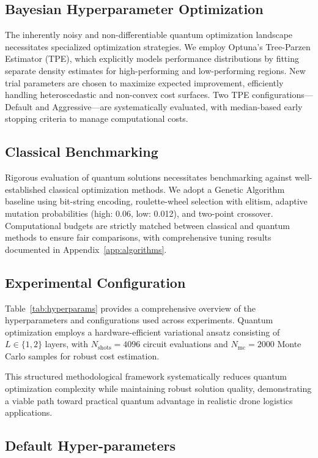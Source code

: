\subsection{Bayesian Hyperparameter Optimization}

The inherently noisy and non-differentiable quantum optimization landscape necessitates specialized optimization strategies. We employ Optuna's Tree-Parzen Estimator (TPE), which explicitly models performance distributions by fitting separate density estimates for high-performing and low-performing regions. New trial parameters are chosen to maximize expected improvement, efficiently handling heteroscedastic and non-convex cost surfaces. Two TPE configurations---Default and Aggressive---are systematically evaluated, with median-based early stopping criteria to manage computational costs.

\subsection{Classical Benchmarking}

Rigorous evaluation of quantum solutions necessitates benchmarking against well-established classical optimization methods. We adopt a Genetic Algorithm baseline using bit-string encoding, roulette-wheel selection with elitism, adaptive mutation probabilities (high: 0.06, low: 0.012), and two-point crossover. Computational budgets are strictly matched between classical and quantum methods to ensure fair comparisons, with comprehensive tuning results documented in Appendix~\ref{app:algorithms}.

\subsection{Experimental Configuration}

Table~\ref{tab:hyperparams} provides a comprehensive overview of the hyperparameters and configurations used across experiments. Quantum optimization employs a hardware-efficient variational ansatz consisting of $L \in \{1,2\}$ layers, with $N_{\text{shots}}=4096$ circuit evaluations and $N_{\text{mc}}=2000$ Monte Carlo samples for robust cost estimation.

This structured methodological framework systematically reduces quantum optimization complexity while maintaining robust solution quality, demonstrating a viable path toward practical quantum advantage in realistic drone logistics applications.


\subsection{Default Hyper-parameters}

